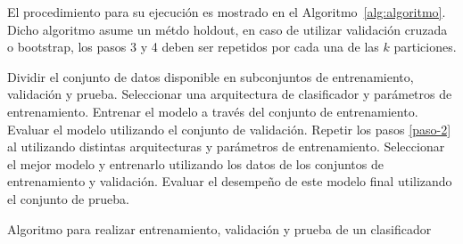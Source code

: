 \documentclass{article}
\begin{document}
El procedimiento para su ejecución es mostrado en el Algoritmo~\ref{alg:algoritmo}. 
Dicho algoritmo asume un métdo holdout, en caso de utilizar validación cruzada o bootstrap, los pasos 3 y 4 deben ser repetidos por cada una de las $k$ particiones. 

\begin{algorithm} 
\begin{algorithmic}[1] 
\STATE Dividir el conjunto de datos disponible en subconjuntos de entrenamiento, validación y prueba.
\STATE Seleccionar una arquitectura de clasificador y parámetros de entrenamiento. \label{paso-2}
\STATE Entrenar el modelo a través del conjunto de entrenamiento. 
\STATE Evaluar el modelo utilizando el conjunto de validación. \label{paso-4}
\STATE Repetir los pasos \ref{paso-2} al \label{paso-4} utilizando distintas arquitecturas y parámetros de entrenamiento.
\STATE Seleccionar el mejor modelo y entrenarlo utilizando los datos de los conjuntos de entrenamiento y validación.
\STATE Evaluar el desempeño de este modelo final utilizando el conjunto de prueba.
\end{algorithmic} 
\caption{Algoritmo para realizar entrenamiento, validación y prueba de un clasificador} 
\label{alg:algoritmo}
\end{algorithm}
\newpage 
\nocite{*}

 
\end{document}
